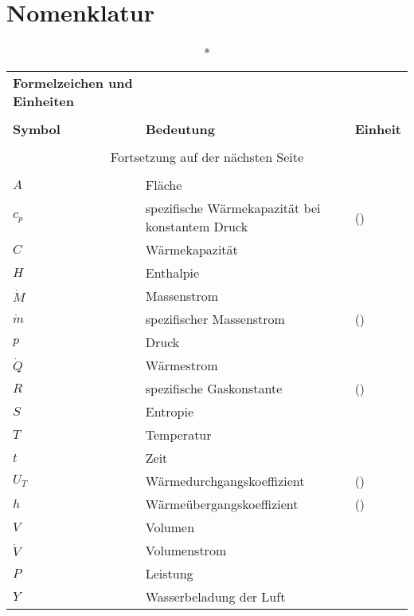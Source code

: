 \chapter*{Nomenklatur}
\begin{onehalfspacing}
\begin{longtable}[h]{p{} p{} p{}}
		\caption*{\textbf{Formelzeichen und Einheiten}} \\
		\\
		\textbf{Symbol} & \textbf{Bedeutung} & \textbf{Einheit} \\ %
		\endhead
		\\
		\multicolumn{3}{c}{Fortsetzung auf der nächsten Seite} \\
		\endfoot
		\multicolumn{3}{c}{ } \\
		\endlastfoot
		
		$A$ & Fläche & \squaremetre\\
		$c_{p}$&spezifische Wärmekapazität bei konstantem Druck&\joule\per(\kilogram\usk\kelvin)\\
			$C$&Wärmekapazität&\watt\per\kilogram\\
		$H $ & Enthalpie & \joule\\	
		$\dot{M}$ & Massenstrom & \kilogram\per\second\\	
		$\dot{m}$ & spezifischer Massenstrom & \kilogram\per(\second\usk\metre)\\
		$p$ & Druck & \pascal\\
		$\dot{Q}$ & Wärmestrom & \watt\\
		$R$ & spezifische Gaskonstante & \joule\per(\kilogram\usk\kelvin)\\
		$S$ & Entropie & \joule\per\kelvin\\
		$T$ & Temperatur & \kelvin\\
		$t$ & Zeit & \second\\
		$U_{T}$ & Wärmedurchgangskoeffizient & \watt\per(\kilogram\usk\kelvin)\\
		$h$ & Wärmeübergangskoeffizient & \watt\per(\squaremetre\usk\kelvin)\\		
		$V$ & Volumen & \cubic\meter\\
		$\dot{V}$&Volumenstrom&\cubic\meter\per\second\\
		$P$ & Leistung & \watt\\
		$Y$ & Wasserbeladung der Luft & \gram\per\kilogram\\
		
		
\end{longtable}


\end{onehalfspacing}
